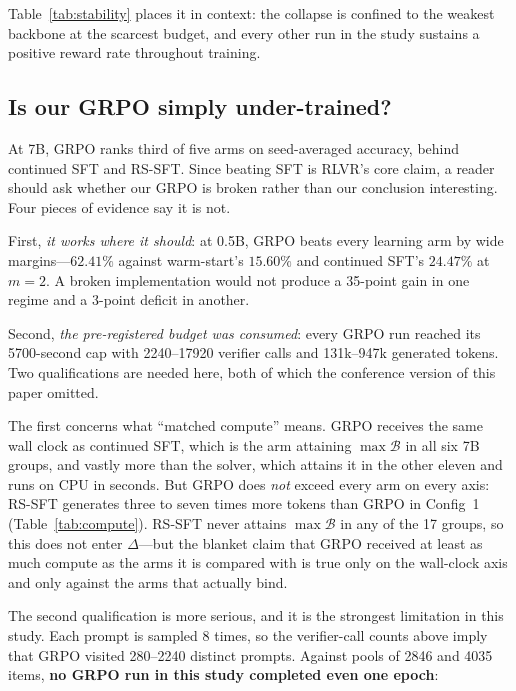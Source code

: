 Table~\ref{tab:stability} places it in context: the collapse is confined to the
weakest backbone at the scarcest budget, and every other run in the study
sustains a positive reward rate throughout training.

\subsection{Is our GRPO simply under-trained?}

At 7B, GRPO ranks third of five arms on seed-averaged accuracy, behind
continued SFT and RS-SFT. Since
beating SFT is RLVR's core claim, a reader should ask whether our GRPO is
broken rather than our conclusion interesting. Four pieces of evidence say it
is not.

First, \emph{it works where it should}: at 0.5B, GRPO beats every learning arm
by wide margins---$62.41\%$ against warm-start's $15.60\%$ and continued SFT's
$24.47\%$ at $m{=}2$. A broken implementation would not produce a
35-point gain in one regime and a 3-point deficit in another.

Second, \emph{the pre-registered budget was consumed}: every GRPO run reached
its 5700-second cap with 2240--17920 verifier calls and 131k--947k generated
tokens. Two qualifications are needed here, both of which the conference
version of this paper omitted.

The first concerns what ``matched compute'' means. GRPO receives the same wall
clock as continued SFT, which is the arm attaining $\max\mathcal{B}$ in all six
7B groups, and vastly more than the solver, which attains it in the other
eleven and runs on CPU in seconds. But GRPO does \emph{not} exceed every arm on
every axis: RS-SFT generates three to seven times more tokens than GRPO in
Config~1 (Table~\ref{tab:compute}). RS-SFT never attains $\max\mathcal{B}$ in
any of the 17 groups, so this does not enter $\Delta$---but the blanket claim
that GRPO received at least as much compute as the arms it is compared with is
true only on the wall-clock axis and only against the arms that actually bind.



The second qualification is more serious, and it is the strongest limitation in
this study. Each prompt is sampled 8 times, so the verifier-call counts above
imply that GRPO visited 280--2240 distinct prompts. Against pools of 2846 and
4035 items, \textbf{no GRPO run in this study completed even one epoch}:

